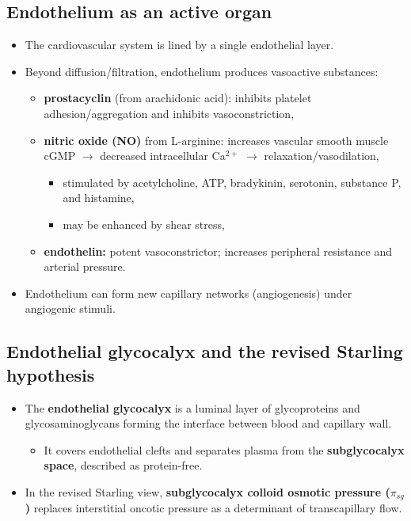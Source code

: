 \documentclass[11pt,a4paper]{article}
\begin{document}
\subsection{Endothelium as an active organ}
\begin{itemize}
\item The cardiovascular system is lined by a single endothelial layer.
\item Beyond diffusion/filtration, endothelium produces vasoactive substances:
  \begin{itemize}
  \item \textbf{prostacyclin} (from arachidonic acid): inhibits platelet adhesion/aggregation and inhibits vasoconstriction,
  \item \textbf{nitric oxide (NO)} from L-arginine: increases vascular smooth muscle cGMP $\rightarrow$ decreased intracellular Ca$^{2+}$ $\rightarrow$ relaxation/vasodilation,
    \begin{itemize}
    \item stimulated by acetylcholine, ATP, bradykinin, serotonin, substance P, and histamine,
    \item may be enhanced by shear stress,
    \end{itemize}
  \item \textbf{endothelin:} potent vasoconstrictor; increases peripheral resistance and arterial pressure.
  \end{itemize}
\item Endothelium can form new capillary networks (angiogenesis) under angiogenic stimuli.
\end{itemize}

\subsection{Endothelial glycocalyx and the revised Starling hypothesis}
\begin{itemize}
\item The \textbf{endothelial glycocalyx} is a luminal layer of glycoproteins and glycosaminoglycans forming the interface between blood and capillary wall.
  \begin{itemize}
  \item It covers endothelial clefts and separates plasma from the \textbf{subglycocalyx space}, described as protein-free.
  \end{itemize}
\item In the revised Starling view, \textbf{subglycocalyx colloid osmotic pressure ($\pi_{sg}$)} replaces interstitial oncotic pressure as a determinant of transcapillary flow.
\end{itemize}
\end{document}
